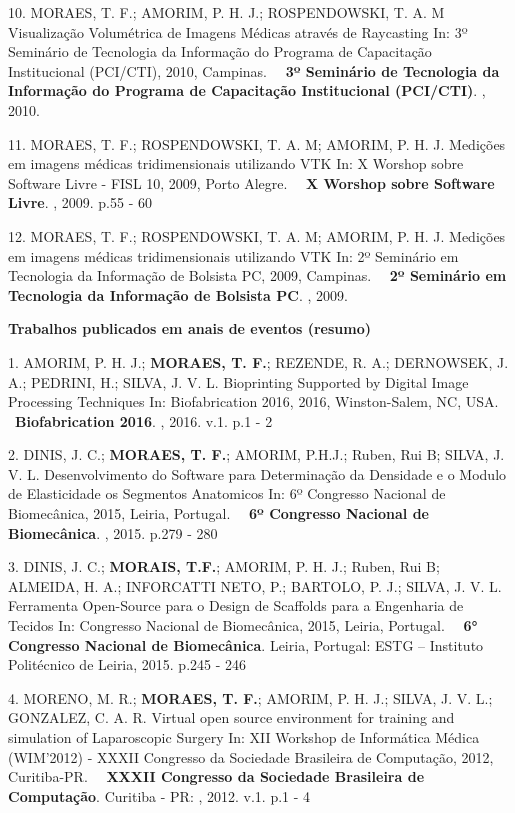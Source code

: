 10. MORAES, T. F.; AMORIM, P. H. J.; ROSPENDOWSKI, T. A. M
Visualização Volumétrica de Imagens Médicas através de Raycasting In: 3º
Seminário de Tecnologia da Informação do Programa de Capacitação
Institucional (PCI/CTI), 2010, Campinas.
    \textbf{3º Seminário de Tecnologia da Informação do Programa de
Capacitação Institucional (PCI/CTI)}. , 2010.

11. MORAES, T. F.; ROSPENDOWSKI, T. A. M; AMORIM, P. H. J.
Medições em imagens médicas tridimensionais utilizando VTK In: X Worshop
sobre Software Livre - FISL 10, 2009, Porto Alegre.
    \textbf{X Worshop sobre Software Livre}. , 2009. p.55 - 60

12. MORAES, T. F.; ROSPENDOWSKI, T. A. M; AMORIM, P. H. J.
Medições em imagens médicas tridimensionais utilizando VTK In: 2º
Seminário em Tecnologia da Informação de Bolsista PC, 2009, Campinas.
    \textbf{2º Seminário em Tecnologia da Informação de Bolsista PC}. ,
2009.

\textbf{Trabalhos publicados em anais de eventos (resumo)}

1. AMORIM, P. H. J.; \textbf{MORAES, T. F.}; REZENDE, R. A.; DERNOWSEK,
J. A.; PEDRINI, H.; SILVA, J. V. L.
Bioprinting Supported by Digital Image Processing Techniques In:
Biofabrication 2016, 2016, Winston-Salem, NC, USA.
    \textbf{Biofabrication 2016}. , 2016. v.1. p.1 - 2

2. DINIS, J. C.; \textbf{MORAES, T. F.}; AMORIM, P.H.J.; Ruben, Rui B;
SILVA, J. V. L.
Desenvolvimento do Software para Determinação da Densidade e o Modulo de
Elasticidade os Segmentos Anatomicos In: 6º Congresso Nacional de
Biomecânica, 2015, Leiria, Portugal.
    \textbf{6º Congresso Nacional de Biomecânica}. , 2015. p.279 - 280

3. DINIS, J. C.; \textbf{MORAIS, T.F.}; AMORIM, P. H. J.; Ruben, Rui B;
ALMEIDA, H. A.; INFORCATTI NETO, P.; BARTOLO, P. J.; SILVA, J. V. L.
Ferramenta Open-Source para o Design de Scaffolds para a Engenharia de
Tecidos In: Congresso Nacional de Biomecânica, 2015, Leiria, Portugal.
    \textbf{6° Congresso Nacional de Biomecânica}. Leiria, Portugal:
ESTG -- Instituto Politécnico de Leiria, 2015. p.245 - 246

4. MORENO, M. R.; \textbf{MORAES, T. F.}; AMORIM, P. H. J.; SILVA, J. V.
L.; GONZALEZ, C. A. R.
Virtual open source environment for training and simulation of
Laparoscopic Surgery In: XII Workshop de Informática Médica (WIM'2012) -
XXXII Congresso da Sociedade Brasileira de Computação, 2012,
Curitiba-PR.
    \textbf{XXXII Congresso da Sociedade Brasileira de Computação}.
Curitiba - PR: , 2012. v.1. p.1 - 4

